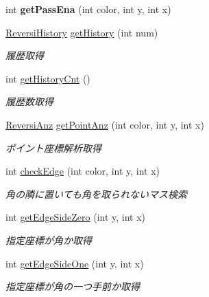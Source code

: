 \begin{DoxyCompactItemize}
int {\bfseries get\+Pass\+Ena} (int color, int y, int x)
\item 
\hyperlink{classjp_1_1gr_1_1java__conf_1_1yuta__yoshinaga_1_1reversi_1_1model_1_1_reversi_history}{Reversi\+History} \hyperlink{classjp_1_1gr_1_1java__conf_1_1yuta__yoshinaga_1_1reversi_1_1model_1_1_reversi_af781f5ebb4fb33b574ec58acfb45a796}{get\+History} (int num)
\begin{DoxyCompactList}\small\item\em 履歴取得 \end{DoxyCompactList}\item 
int \hyperlink{classjp_1_1gr_1_1java__conf_1_1yuta__yoshinaga_1_1reversi_1_1model_1_1_reversi_a286949e070d0cfc8a1d9562a298b7b98}{get\+History\+Cnt} ()
\begin{DoxyCompactList}\small\item\em 履歴数取得 \end{DoxyCompactList}\item 
\hyperlink{classjp_1_1gr_1_1java__conf_1_1yuta__yoshinaga_1_1reversi_1_1model_1_1_reversi_anz}{Reversi\+Anz} \hyperlink{classjp_1_1gr_1_1java__conf_1_1yuta__yoshinaga_1_1reversi_1_1model_1_1_reversi_a6da3f67c0468cf59ba6ceb796133c921}{get\+Point\+Anz} (int color, int y, int x)
\begin{DoxyCompactList}\small\item\em ポイント座標解析取得 \end{DoxyCompactList}\item 
int \hyperlink{classjp_1_1gr_1_1java__conf_1_1yuta__yoshinaga_1_1reversi_1_1model_1_1_reversi_a4874c6523adfdfd42dfbd625f5e3fe7a}{check\+Edge} (int color, int y, int x)
\begin{DoxyCompactList}\small\item\em 角の隣に置いても角を取られないマス検索 \end{DoxyCompactList}\item 
int \hyperlink{classjp_1_1gr_1_1java__conf_1_1yuta__yoshinaga_1_1reversi_1_1model_1_1_reversi_a3989b051544745724fc372d4a6b8a7f7}{get\+Edge\+Side\+Zero} (int y, int x)
\begin{DoxyCompactList}\small\item\em 指定座標が角か取得 \end{DoxyCompactList}\item 
int \hyperlink{classjp_1_1gr_1_1java__conf_1_1yuta__yoshinaga_1_1reversi_1_1model_1_1_reversi_aa3c701584a82e4656cb1c60123454953}{get\+Edge\+Side\+One} (int y, int x)
\begin{DoxyCompactList}\small\item\em 指定座標が角の一つ手前か取得 \end{DoxyCompactList}\item 

\end{DoxyCompactItemize}

